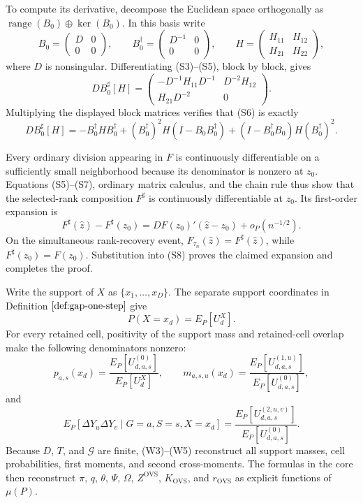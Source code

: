 To compute its derivative, decompose the Euclidean space orthogonally as \(\operatorname{range}(B_0)\oplus\ker(B_0)\).  In this basis write
\[
 B_0=\begin{pmatrix}D&0\\0&0\end{pmatrix},
 \qquad
 B_0^\dagger=\begin{pmatrix}D^{-1}&0\\0&0\end{pmatrix},
 \qquad
 H=\begin{pmatrix}H_{11}&H_{12}\\H_{21}&H_{22}\end{pmatrix},
\]
where \(D\) is nonsingular.  Differentiating (S3)--(S5), block by block, gives
\[
 DB_0^\sharp[H]
 =\begin{pmatrix}
 -D^{-1}H_{11}D^{-1}&D^{-2}H_{12}\\
 H_{21}D^{-2}&0
 \end{pmatrix}.
\tag{S6}
\]
Multiplying the displayed block matrices verifies that (S6) is exactly
\[
 DB_0^\sharp[H]
 =-B_0^\dagger HB_0^\dagger
 +(B_0^\dagger)^2H(I-B_0B_0^\dagger)
 +(I-B_0^\dagger B_0)H(B_0^\dagger)^2.
\tag{S7}
\]

Every ordinary division appearing in \(F\) is continuously differentiable on a sufficiently small neighborhood because its denominator is nonzero at \(z_0\).  Equations (S5)--(S7), ordinary matrix calculus, and the chain rule thus show that the selected-rank composition \(F^\sharp\) is continuously differentiable at \(z_0\).  Its first-order expansion is
\[
 F^\sharp(\widehat z)-F^\sharp(z_0)
 =DF(z_0)'(\widehat z-z_0)+o_P(n^{-1/2}).
\tag{S8}
\]
On the simultaneous rank-recovery event, \(F_{\tau_n}(\widehat z)=F^\sharp(\widehat z)\), while \(F^\sharp(z_0)=F(z_0)\).  Substitution into (S8) proves the claimed expansion and completes the proof.

Write the support of \(X\) as \(\{x_1,\ldots,x_D\}\).  The separate support coordinates in Definition \(\ref{def:gap-one-step}\) give
\[
 P(X=x_d)=E_P[U_d^X].
\tag{W3}
\]
For every retained cell, positivity of the support mass and retained-cell overlap make the following denominators nonzero:
\[
 p_{a,s}(x_d)
 =\frac{E_P[U^{(0)}_{d,a,s}]}{E_P[U_d^X]},
 \qquad
 m_{a,s,u}(x_d)
 =\frac{E_P[U^{(1,u)}_{d,a,s}]}{E_P[U^{(0)}_{d,a,s}]},
\tag{W4}
\]
and
\[
 E_P[\Delta Y_u\Delta Y_v\mid G=a,S=s,X=x_d]
 =\frac{E_P[U^{(2,u,v)}_{d,a,s}]}{E_P[U^{(0)}_{d,a,s}]}.
\tag{W5}
\]
Because \(D\), \(T\), and \(\mathcal G\) are finite, (W3)--(W5) reconstruct all support masses, cell probabilities, first moments, and second cross-moments.  The formulas in the core then reconstruct \(\pi\), \(q\), \(\theta\), \(\Psi\), \(\Omega\), \(Z^{\mathrm{OVS}}\), \(K_{\mathrm{OVS}}\), and \(r_{\mathrm{OVS}}\) as explicit functions of \(\mu(P)\).

